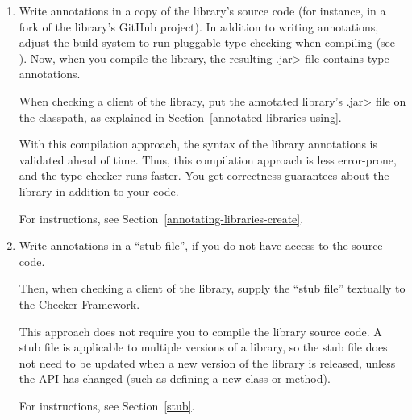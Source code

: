\begin{enumerate}
\item
  Write annotations in a copy of the library's source code (for instance,
  in a fork of the library's GitHub project).  In addition to writing
  annotations, adjust the build system to run pluggable-type-checking when
  compiling (see ).  Now, when you compile
  the library, the resulting \<.jar> file contains type annotations.

  When checking a client of the library,
  put the annotated library's \<.jar> file on the classpath, as explained in
  Section~\ref{annotated-libraries-using}.


  With this compilation approach, the syntax of the library annotations is
  validated ahead of time.  Thus, this compilation approach is less
  error-prone, and the type-checker runs faster.  You get
  correctness guarantees about the library in addition to your code.

  For instructions, see Section~\ref{annotating-libraries-create}.

\item
  Write annotations in a ``stub file'', if you do not have access to the
  source code.

  Then, when checking a client of the library,
  supply the ``stub file'' textually to the Checker Framework.

  This approach does not require you to compile the library source
  code.
  A stub file is applicable to multiple versions of a library, so
  the stub file does not need to be updated when a new version of the
  library is released, unless the API has changed (such as defining a new
  class or method).

  For instructions, see Section~\ref{stub}.

\end{enumerate}


